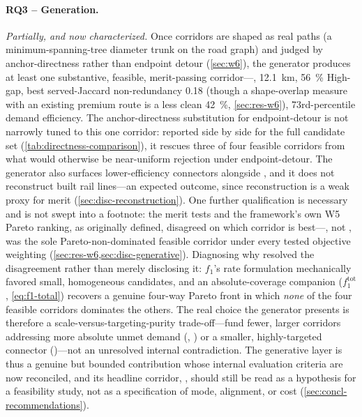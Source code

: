 \paragraph{RQ3 -- Generation.} \emph{Partially, and now characterized.} Once corridors
are shaped as real paths (a minimum-spanning-tree diameter trunk on the road graph) and
judged by anchor-directness rather than endpoint detour (\cref{sec:w6}), the generator
produces at least one substantive, feasible, merit-passing corridor---,
\SI{12.1}{\kilo\metre}, \SI{56}{\percent} High-gap, best served-\ageb Jaccard
non-redundancy \num{0.18} (though a shape-overlap measure with an existing premium
route is a less clean \SI{42}{\percent}, \cref{sec:res-w6}), \num{73}rd-percentile
demand efficiency. The anchor-directness substitution for endpoint-detour is not
narrowly tuned to this one corridor: reported side by side for the full candidate set
(\cref{tab:directness-comparison}), it rescues three of four feasible \zmg corridors
from what would otherwise be near-uniform rejection under endpoint-detour. The
generator also surfaces lower-efficiency connectors alongside , and it
does not reconstruct built rail lines---an expected outcome, since reconstruction is a
weak proxy for merit (\cref{sec:disc-reconstruction}). One further qualification is
necessary and is not swept into a footnote: the merit tests and the framework's own W5
Pareto ranking, as originally defined, disagreed on which corridor is best---,
not , was the sole Pareto-non-dominated feasible corridor under every tested
objective weighting (\cref{sec:res-w6,sec:disc-generative}). Diagnosing why resolved the
disagreement rather than merely disclosing it: $f_1$'s rate formulation mechanically
favored small, homogeneous candidates, and an absolute-coverage companion
($f_1^{\text{tot}}$, \cref{eq:f1-total}) recovers a genuine four-way Pareto front in which
\emph{none} of the four feasible corridors dominates the others. The real choice the
generator presents is therefore a scale-versus-targeting-purity trade-off---fund fewer,
larger corridors addressing more absolute unmet demand (, ) or
a smaller, highly-targeted connector ()---not an unresolved internal
contradiction. The generative layer is thus a genuine but bounded contribution whose
internal evaluation criteria are now reconciled, and its headline corridor,
, should still be read as a hypothesis for a feasibility study, not as a
specification of mode, alignment, or cost (\cref{sec:concl-recommendations}).

